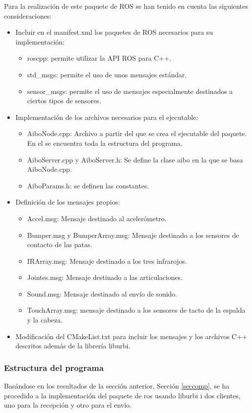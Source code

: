 \documentclass[12pt,a4paper,final,twoside]{book}
\begin{document}
Para la realización de este paquete de ROS se han tenido en cuenta las siguientes consideraciones:
\begin{itemize}
\item Incluir en el manifest.xml los paquetes de ROS necesarios para su implementación:
\begin{itemize}
\item roscpp: permite utilizar la API ROS para C++.
\item std{\_}msgs: permite el uso de unos mensajes estándar.
\item sensor{\_}msgs: permite el uso de mensajes especialmente destinados a ciertos tipos de sensores.
\end{itemize}
\item Implementación de los archivos necesarios para el ejecutable:
\begin{itemize}
\item AiboNode.cpp: Archivo a partir del que se crea el ejecutable del paquete. En el se encuentra toda la estructura del programa.
\item AiboServer.cpp y AiboServer.h: Se define la clase aibo en la que se basa AiboNode.cpp.
\item AiboParams.h: se definen las constantes.
\end{itemize} 
\item Definición de los mensajes propios:
\begin{itemize}
\item Accel.msg: Mensaje destinado al acelerómetro.
\item Bumper.msg y BumperArray.msg: Mensaje destinado a los sensores de contacto de las patas.
\item IRArray.msg: Mensaje destinado a los tres infrarojos.
\item Jointes.msg: Mensaje destinado a las articulaciones.
\item Sound.msg: Mensaje destinado al envío de sonido.
\item TouchArray.msg: mensaje destinado a los sensores de tacto de la espalda y la cabeza.
\end{itemize}
\item Modificación del CMakeList.txt para incluir los mensajes y los archivos C++ descritos además de la librería liburbi.
\end{itemize}

\subsubsection{Estructura del programa}
Basándose en los resultados de la sección anterior, Sección \ref{seccomp}, se ha procedido a la implementación del paquete de ros usando liburbi i dos clientes, uno para la recepción  y otro para el envío.
\end{document}
